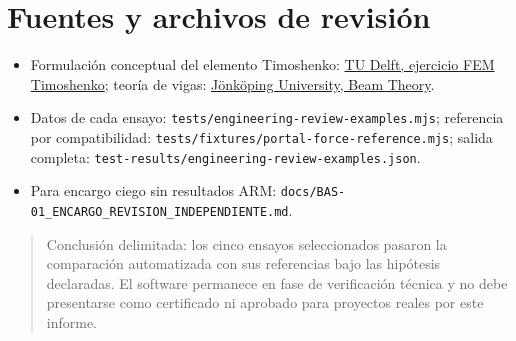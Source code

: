\documentclass[11pt,a4paper]{article}
\newcommand{\note}[1]{\begin{quote}\small\color{armgray}#1\end{quote}}
\begin{document}
\section{Fuentes y archivos de revisión}
\begin{itemize}
\item Formulación conceptual del elemento Timoshenko:
\href{https://oit.tudelft.nl/Finite-Elements-in-CEG/main/structural_linear/Exercises/pyjive_timoshenko.html}
{TU Delft, ejercicio FEM Timoshenko}; teoría de vigas:
\href{https://mechanics.ju.se/SolidMechanics/BeamTheory.html}
{Jönköping University, Beam Theory}.
\item Datos de cada ensayo: \texttt{tests/engineering-review-examples.mjs};
referencia por compatibilidad: \texttt{tests/fixtures/portal-force-reference.mjs};
salida completa: \texttt{test-results/engineering-review-examples.json}.
\item Para encargo ciego sin resultados ARM:
\texttt{docs/BAS-01\_ENCARGO\_REVISION\_INDEPENDIENTE.md}.
\end{itemize}

\note{Conclusión delimitada: los cinco ensayos seleccionados pasaron la
comparación automatizada con sus referencias bajo las hipótesis declaradas.
El software permanece en fase de verificación técnica y no debe presentarse
como certificado ni aprobado para proyectos reales por este informe.}
\end{document}

